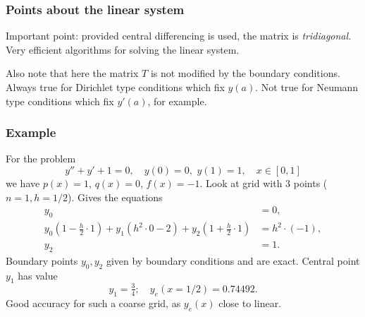 \documentclass{beamer}
\begin{document}
\begin{frame}
\end{frame}

\begin{frame}
  \frametitle{Points about the linear system}

  Important point: provided central differencing is used, the matrix
  is \emph{tridiagonal}.  Very efficient algorithms for solving the
  linear system. \pause

  \vspace{1ex}

  Also note that here the matrix $T$ is not modified by the boundary
  conditions.  Always true for Dirichlet type conditions which fix
  $y(a)$.  Not true for Neumann type conditions which fix $y'(a)$,
  for example.

\end{frame}

\begin{frame}
  \frametitle{Example}

  For the problem
  \begin{equation*}
    y'' + y' + 1 = 0, \quad y(0) = 0, \,\, y(1) = 1, \quad x \in [0, 1]
  \end{equation*}
  we have $p(x) = 1$, $q(x) = 0$, $f(x) = -1$. \pause  Look at grid
  with 3 points ($n = 1, h = 1/2$). \pause Gives the equations
  \begin{align*}
    y_0 & = 0, \\
    y_0 \left( 1 - \tfrac{h}{2} \cdot 1 \right) + y_1 \left( h^2 \cdot
      0 - 2 \right) + y_2 \left( 1 + \tfrac{h}{2} \cdot 1 \right) & =
    h^2 \cdot (-1), \\
    y_2 & = 1.
  \end{align*} \pause
  Boundary points $y_0, y_2$ given by boundary conditions and are
  exact. \pause Central point $y_1$ has value
  \begin{equation*}
    y_1 = \tfrac{3}{4}; \quad y_e(x = 1/2) = 0.74492.
  \end{equation*}
  Good accuracy for such a coarse grid, as $y_e(x)$ close to linear.

\end{frame}
\end{document}
